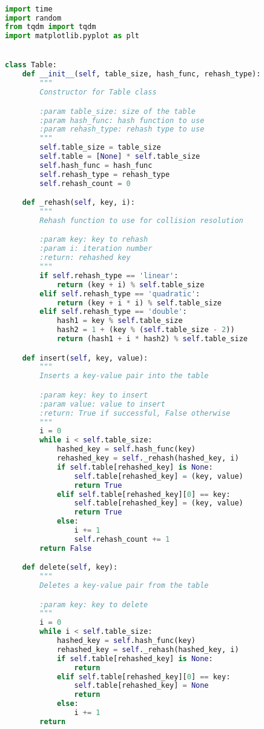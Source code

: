 \documentclass{article}
\begin{document}
\begin{lstlisting}[language=Python,label={lst:codesrc}]

import time
import random
from tqdm import tqdm
import matplotlib.pyplot as plt


class Table:
    def __init__(self, table_size, hash_func, rehash_type):
        """
        Constructor for Table class

        :param table_size: size of the table
        :param hash_func: hash function to use
        :param rehash_type: rehash type to use
        """
        self.table_size = table_size
        self.table = [None] * self.table_size
        self.hash_func = hash_func
        self.rehash_type = rehash_type
        self.rehash_count = 0

    def _rehash(self, key, i):
        """
        Rehash function to use for collision resolution

        :param key: key to rehash
        :param i: iteration number
        :return: rehashed key
        """
        if self.rehash_type == 'linear':
            return (key + i) % self.table_size
        elif self.rehash_type == 'quadratic':
            return (key + i * i) % self.table_size
        elif self.rehash_type == 'double':
            hash1 = key % self.table_size
            hash2 = 1 + (key % (self.table_size - 2))
            return (hash1 + i * hash2) % self.table_size

    def insert(self, key, value):
        """
        Inserts a key-value pair into the table

        :param key: key to insert
        :param value: value to insert
        :return: True if successful, False otherwise
        """
        i = 0
        while i < self.table_size:
            hashed_key = self.hash_func(key)
            rehashed_key = self._rehash(hashed_key, i)
            if self.table[rehashed_key] is None:
                self.table[rehashed_key] = (key, value)
                return True
            elif self.table[rehashed_key][0] == key:
                self.table[rehashed_key] = (key, value)
                return True
            else:
                i += 1
                self.rehash_count += 1
        return False

    def delete(self, key):
        """
        Deletes a key-value pair from the table

        :param key: key to delete
        """
        i = 0
        while i < self.table_size:
            hashed_key = self.hash_func(key)
            rehashed_key = self._rehash(hashed_key, i)
            if self.table[rehashed_key] is None:
                return
            elif self.table[rehashed_key][0] == key:
                self.table[rehashed_key] = None
                return
            else:
                i += 1
        return


\end{lstlisting}
\end{document}
